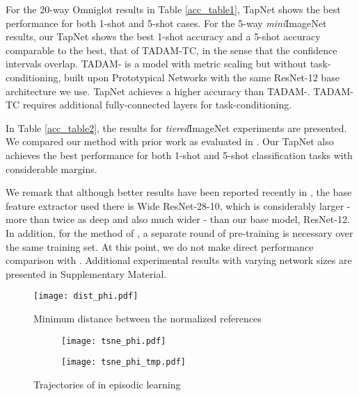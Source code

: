 \documentclass{article}
\begin{document}
For the 20-way Omniglot results in Table \ref{acc_table1}, TapNet shows the best performance for both 1-shot and 5-shot cases. For the 5-way \textit{mini}ImageNet results, our TapNet shows the best 1-shot accuracy and a 5-shot accuracy comparable to the best,
that of TADAM-TC, in the sense that the confidence intervals overlap. 
TADAM- is a model with metric scaling but without task-conditioning, built upon Prototypical Networks with the same ResNet-12 base architecture we use. TapNet achieves a higher accuracy than TADAM-. TADAM-TC requires additional fully-connected layers for task-conditioning.



In Table \ref{acc_table2}, the results for \textit{tiered}ImageNet experiments are presented. We compared our method with prior work as evaluated in \cite{Liu}. Our TapNet also achieves the best performance for both 1-shot and 5-shot classification tasks with considerable margins.

We remark that although better results have been reported recently in \cite{LEO}, the base feature extractor used there is Wide ResNet-28-10, which is considerably larger - more than twice as deep and also much wider - than our base model, ResNet-12. In addition, for the method of \cite{LEO}, a separate round of pre-training is necessary over the same training set. At this point, we do not make direct performance comparison with \cite{LEO}.
Additional experimental results with varying network sizes are presented in Supplementary Material.

\begin{figure}[!h]
	\centering
	\texttt{[image: dist\_phi.pdf]}
	\caption{Minimum distance between the normalized references}
	\label{fig:dist_phi}
\end{figure}



\begin{figure*}[h]
	\centering
	\begin{subfigure}[b]{0.38\textwidth}
		\texttt{[image: tsne\_phi.pdf]}
		\label{fig:tsne_phi}
	\end{subfigure}	
	\label{fig:PhiTrain}
	\begin{subfigure}[b]{0.38\textwidth}
		\texttt{[image: tsne\_phi\_tmp.pdf]}
		\label{fig:tsne_phi3}
	\end{subfigure}	
	\caption{Trajectories of  in episodic learning}
	\label{fig:tsne_phi_full}
\end{figure*} 
\end{document}
